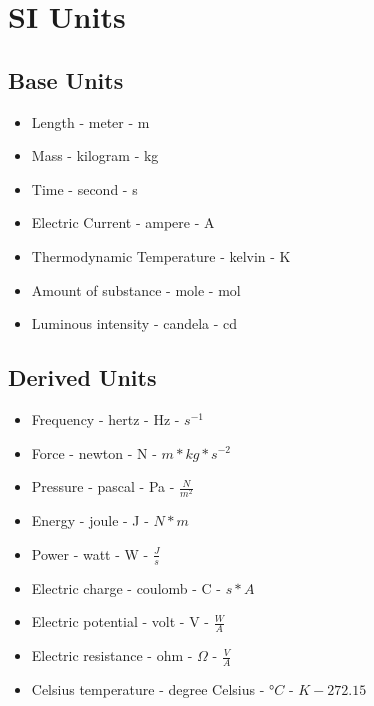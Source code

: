 \section{SI Units}
  \subsection{Base Units}
  \begin{itemize}
    \item Length - meter - m
    \item Mass - kilogram - kg
    \item Time - second - s
    \item Electric Current - ampere - A
    \item Thermodynamic Temperature - kelvin - K
    \item Amount of substance - mole - mol
    \item Luminous intensity - candela - cd
  \end{itemize}
  \subsection{Derived Units}
  \begin{itemize}
    \item Frequency - hertz - Hz - $s^{-1}$
    \item Force - newton - N - $m*kg*s^{-2}$
    \item Pressure - pascal - Pa - $\frac{N}{m^2}$
    \item Energy - joule - J - $N*m$
    \item Power - watt - W - $\frac{J}{s}$
    \item Electric charge - coulomb - C - $s*A$
    \item Electric potential - volt - V - $\frac{W}{A}$
    \item Electric resistance - ohm - $\Omega$ - $\frac{V}{A}$
    \item Celsius temperature - degree Celsius - $\si{\degree}C$ - $K-272.15 $
  \end{itemize}
\newpage